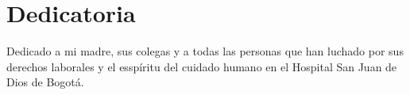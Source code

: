 \section*{Dedicatoria}
Dedicado a mi madre, sus colegas y a todas las personas que han luchado por sus derechos laborales y el esspíritu del cuidado humano en el Hospital San Juan de Dios de Bogotá.
\pagebreak
